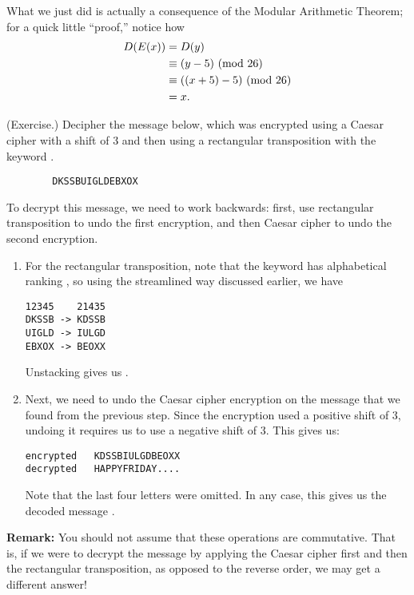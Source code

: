 \documentclass[letterpaper]{article}
\begin{document}
\bigskip 

What we just did is actually a consequence of the Modular Arithmetic Theorem; for a quick little ``proof,'' notice how  
\begin{equation*}
    \begin{aligned}
        D(E(x)) &= D(y) \\
            &\equiv (y - 5) \ (\mathrm{mod}\ 26) \\ 
            &\equiv ((x + 5) - 5) \ (\mathrm{mod}\ 26) \\ 
            &= x.
    \end{aligned} 
\end{equation*}

\begin{mdframed}
    (Exercise.) Decipher the message below, which was encrypted using a Caesar cipher with a shift of 3 and then using a rectangular transposition with the keyword .
    \begin{verbatim}
        DKSSBUIGLDEBXOX\end{verbatim}

    \begin{mdframed}
        To decrypt this message, we need to work backwards: first, use rectangular transposition to undo the first encryption, and then Caesar cipher to undo the second encryption.
        \begin{enumerate}
            \item For the rectangular transposition, note that the keyword has alphabetical ranking , so using the streamlined way discussed earlier, we have 
            \begin{mdframed}
                \begin{verbatim}
12345    21435
DKSSB -> KDSSB
UIGLD -> IULGD
EBXOX -> BEOXX\end{verbatim}
            \end{mdframed}
            Unstacking gives us .

            \item Next, we need to undo the Caesar cipher encryption on the message that we found from the previous step. Since the encryption used a positive shift of 3, undoing it requires us to use a negative shift of 3. This gives us: 
            \begin{mdframed}
                \begin{verbatim}
encrypted   KDSSBIULGDBEOXX
decrypted   HAPPYFRIDAY....\end{verbatim}
            \end{mdframed}
            Note that the last four letters were omitted. In any case, this gives us the decoded message .
        \end{enumerate}
    \end{mdframed}
\end{mdframed}
\textbf{Remark:} You should not assume that these operations are commutative. That is, if we were to decrypt the message by applying the Caesar cipher first and then the rectangular transposition, as opposed to the reverse order, we may get a different answer!
\end{document}
